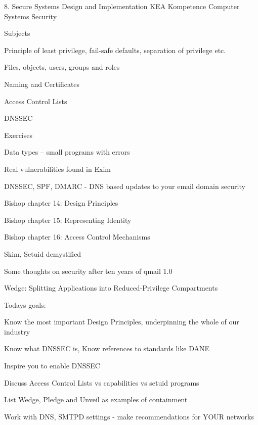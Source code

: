 \documentclass[Screen16to9,17pt]{foils}
\begin{document}
\mytitlepage
{8. Secure Systems Design and Implementation}
{KEA Kompetence Computer Systems Security}



\begin{list1}
\item Subjects
\begin{list2}
\item Principle of least privilege, fail-safe defaults, separation of privilege etc.
\item Files, objects, users, groups and roles
\item Naming and Certificates
\item Access Control Lists
\item DNSSEC
\end{list2}
\item Exercises
\begin{list2}
\item Data types -- small programs with errors
\item Real vulnerabilities found in Exim
\item DNSSEC, SPF, DMARC - DNS based updates to your email domain security
\end{list2}
\end{list1}




\begin{list1}
\item Bishop chapter 14: Design Principles
\item Bishop chapter 15: Representing Identity
\item Bishop chapter 16: Access Control Mechanisms
\item Skim, Setuid demystified
\item Some thoughts on security after ten years of qmail 1.0
\item Wedge: Splitting Applications into Reduced-Privilege Compartments
\end{list1}


Todays goals:
\begin{list2}
\item Know the most important Design Principles, underpinning the whole of our industry
\item Know what DNSSEC is, Know references to standards like DANE
\item Inspire you to enable DNSSEC
\item Discuss Access Control Lists vs capabilities vs setuid programs
\item List Wedge, Pledge and Unveil as examples of containment
\item Work with DNS, SMTPD settings - make recommendations for YOUR networks
\end{list2}
\end{document}
